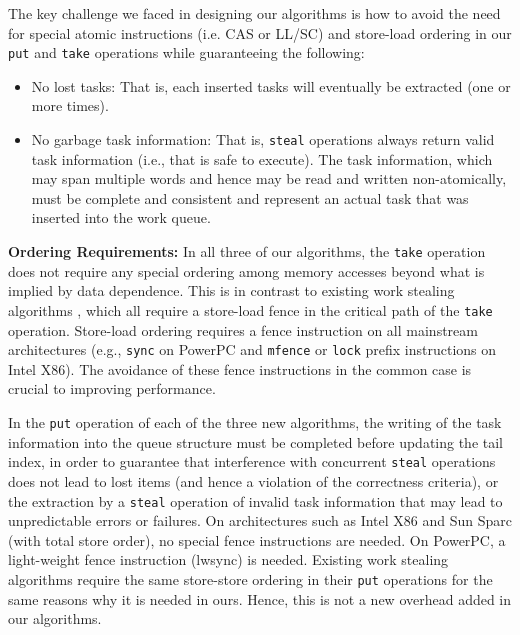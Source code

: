 The key challenge we faced in designing our algorithms is how to avoid
the need for special atomic instructions (i.e. CAS or LL/SC) and
store-load ordering in our \lstinline!put! and \lstinline!take!
operations while guaranteeing the following:

\begin{itemize}
\item No lost tasks: That is, each inserted tasks will eventually be
  extracted (one or more times).
\item No garbage task information: That is, \lstinline!steal!
  operations always return valid task information (i.e., that is safe
  to execute). The task information, which may span multiple words and
  hence may be read and written non-atomically, must be complete and
  consistent and represent an actual task that was inserted into the
  work queue.
\end{itemize}

\textbf{Ordering Requirements:} In all three of our algorithms, the
\lstinline!take! operation does not require any special ordering among
memory accesses beyond what is implied by data dependence. This is in
contrast to existing work stealing algorithms \cite{Arora2001,
  Chase2005, Frigo1998, Hendler2006, Hendler2002}, which all require a
store-load fence in the critical path of the \lstinline!take!
operation. Store-load ordering requires a fence instruction on all
mainstream architectures (e.g., \lstinline!sync! on PowerPC and
\lstinline!mfence! or \lstinline!lock! prefix instructions on Intel
X86). The avoidance of these fence instructions in the common case is
crucial to improving performance.

In the \lstinline!put! operation of each of the three new algorithms,
the writing of the task information into the queue structure must be
completed before updating the tail index, in order to guarantee that
interference with concurrent \lstinline!steal! operations does not
lead to lost items (and hence a violation of the correctness
criteria), or the extraction by a \lstinline!steal! operation of
invalid task information that may lead to unpredictable errors or
failures. On architectures such as Intel X86 and Sun Sparc (with total
store order), no special fence instructions are needed. On PowerPC, a
light-weight fence instruction (lwsync) is needed. Existing work
stealing algorithms \cite{Arora2001, Chase2005, Frigo1998,
  Hendler2006, Hendler2002} require the same store-store ordering in
their \lstinline!put! operations for the same reasons why it is needed
in ours. Hence, this is not a new overhead added in our algorithms.

